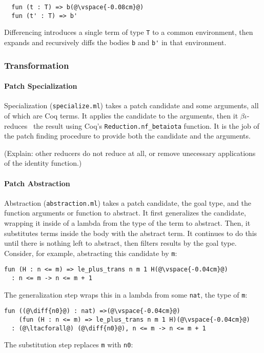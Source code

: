 \begin{lstlisting}
  fun (t : T) => b(@\vspace{-0.08cm}@)
  fun (t' : T) => b'
\end{lstlisting}
Differencing introduces a single term of type \lstinline{T} to a common environment,
then expands and recursively diffs the bodies \lstinline{b} and \lstinline{b'} in that environment.

\subsubsection{Transformation}
\label{sec:pumpkin-impl-trans}

\paragraph{Patch Specialization} Specialization (\lstinline{specialize.ml}) takes a patch candidate and some arguments,
all of which are Coq terms.
It applies the candidate to the arguments, then it $\beta\iota$-reduces~\cite{equality} the result using Coq's
\lstinline{Reduction.nf_betaiota} function. It is the job of the 
patch finding procedure to provide both the candidate and the arguments.

(Explain: other reducers do not reduce at all, or remove unecessary applications of the identity function.)

\paragraph{Patch Abstraction} Abstraction (\lstinline{abstraction.ml}) takes a patch candidate, 
the goal type, and the function arguments or function to abstract.
It first generalizes the candidate, wrapping it inside of a lambda from the type of the term to abstract.
Then, it substitutes terms inside the body with the abstract term.
It continues to do this until there is nothing left to abstract, then filters results by the goal type.
Consider, for example, abstracting this candidate by \lstinline{m}:

\begin{lstlisting}[language=coq]
  fun (H : n <= m) => le_plus_trans n m 1 H(@\vspace{-0.04cm}@)
  : n <= m -> n <= m + 1
\end{lstlisting}
The generalization step wraps this in a lambda from some \lstinline{nat}, the type of \lstinline{m}:

\begin{lstlisting}[language=coq]
  fun ((@\diff{n0}@) : nat) =>(@\vspace{-0.04cm}@)
    (fun (H : n <= m) => le_plus_trans n m 1 H)(@\vspace{-0.04cm}@)
  : (@\ltacforall@) (@\diff{n0}@), n <= m -> n <= m + 1
\end{lstlisting}
The substitution step replaces \lstinline{m} with \lstinline{n0}:


